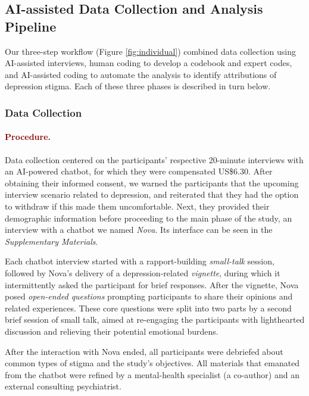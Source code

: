 \subsection{AI-assisted Data Collection and Analysis Pipeline}



Our three-step workflow (Figure \ref{fig:individual}) combined data collection using AI-assisted interviews, human coding to develop a codebook and expert codes, and AI-assisted coding to automate the analysis to identify attributions of depression stigma.
Each of these three phases is described in turn below.




\subsubsection{Data Collection}
\label{method:datacollection}

\paragraph{\textcolor{darkred}{\textbf{Procedure.}}}
Data collection centered on the participants' respective 20-minute interviews with an AI-powered chatbot, for which they were compensated US\$6.30. 
After obtaining their informed consent, we warned the participants that the upcoming interview scenario related to depression, and reiterated that they had the option to withdraw if this made them uncomfortable. 
Next, they provided their demographic information before proceeding to the main phase of the study, an interview with a chatbot we named \textit{Nova}. 
Its interface can be seen in the \textit{Supplementary Materials}.


Each chatbot interview started with a rapport-building \textit{small-talk} session, followed by Nova's delivery of a depression-related \textit{vignette}, during which it intermittently asked the participant for brief responses. 
After the vignette, Nova posed \textit{open-ended questions} prompting participants to share their opinions and related experiences. 
These core questions were split into two parts by a second brief session of small talk, aimed at re-engaging the participants with lighthearted discussion and relieving their potential emotional burdens. 

After the interaction with Nova ended, all participants were debriefed about common types of stigma and the study's objectives. 
All materials that emanated from the chatbot were refined by a mental-health specialist (a co-author) and an external consulting psychiatrist.



